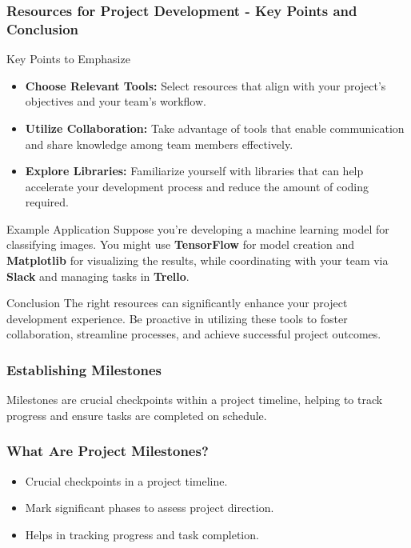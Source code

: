\documentclass[aspectratio=169]{beamer}
\begin{document}
\begin{frame}[fragile]
    \frametitle{Resources for Project Development - Key Points and Conclusion}
    \begin{block}{Key Points to Emphasize}
        \begin{itemize}
            \item \textbf{Choose Relevant Tools:} Select resources that align with your project's objectives and your team's workflow.
            \item \textbf{Utilize Collaboration:} Take advantage of tools that enable communication and share knowledge among team members effectively.
            \item \textbf{Explore Libraries:} Familiarize yourself with libraries that can help accelerate your development process and reduce the amount of coding required.
        \end{itemize}
    \end{block}

    \begin{block}{Example Application}
        Suppose you're developing a machine learning model for classifying images. You might use \textbf{TensorFlow} for model creation and \textbf{Matplotlib} for visualizing the results, while coordinating with your team via \textbf{Slack} and managing tasks in \textbf{Trello}.
    \end{block}

    \begin{block}{Conclusion}
        The right resources can significantly enhance your project development experience. Be proactive in utilizing these tools to foster collaboration, streamline processes, and achieve successful project outcomes.
    \end{block}
\end{frame}

\begin{frame}[fragile]
    \frametitle{Establishing Milestones}
    Milestones are crucial checkpoints within a project timeline, helping to track progress and ensure tasks are completed on schedule.
\end{frame}

\begin{frame}[fragile]
    \frametitle{What Are Project Milestones?}
    \begin{itemize}
        \item Crucial checkpoints in a project timeline.
        \item Mark significant phases to assess project direction.
        \item Helps in tracking progress and task completion.
    \end{itemize}
\end{frame}
\end{document}
